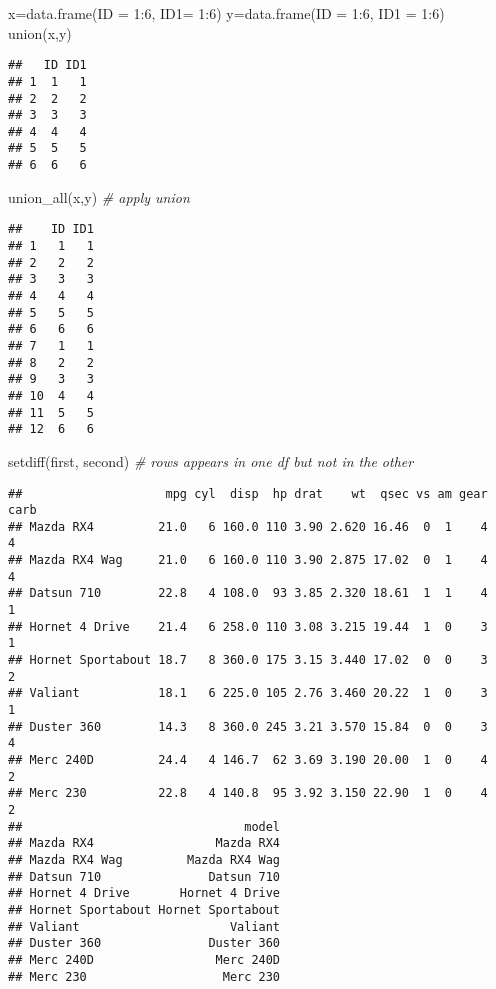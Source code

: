 \documentclass[
]{article}
\newenvironment{Shaded}{\begin{snugshade}}{\end{snugshade}}
\newcommand{\AttributeTok}[1]{\textcolor[rgb]{0.77,0.63,0.00}{#1}}
\newcommand{\CommentTok}[1]{\textcolor[rgb]{0.56,0.35,0.01}{\textit{#1}}}
\newcommand{\DecValTok}[1]{\textcolor[rgb]{0.00,0.00,0.81}{#1}}
\newcommand{\FunctionTok}[1]{\textcolor[rgb]{0.00,0.00,0.00}{#1}}
\newcommand{\NormalTok}[1]{#1}
\newcommand{\OtherTok}[1]{\textcolor[rgb]{0.56,0.35,0.01}{#1}}
\newcommand{\SpecialCharTok}[1]{\textcolor[rgb]{0.00,0.00,0.00}{#1}}
\begin{document}
\begin{Shaded}
\begin{Highlighting}[]
\NormalTok{x}\OtherTok{=}\FunctionTok{data.frame}\NormalTok{(}\AttributeTok{ID =} \DecValTok{1}\SpecialCharTok{:}\DecValTok{6}\NormalTok{, }\AttributeTok{ID1=} \DecValTok{1}\SpecialCharTok{:}\DecValTok{6}\NormalTok{)}
\NormalTok{y}\OtherTok{=}\FunctionTok{data.frame}\NormalTok{(}\AttributeTok{ID =} \DecValTok{1}\SpecialCharTok{:}\DecValTok{6}\NormalTok{,  }\AttributeTok{ID1 =} \DecValTok{1}\SpecialCharTok{:}\DecValTok{6}\NormalTok{)}
\FunctionTok{union}\NormalTok{(x,y)}
\end{Highlighting}
\end{Shaded}

\begin{verbatim}
##   ID ID1
## 1  1   1
## 2  2   2
## 3  3   3
## 4  4   4
## 5  5   5
## 6  6   6
\end{verbatim}

\begin{Shaded}
\begin{Highlighting}[]
\FunctionTok{union\_all}\NormalTok{(x,y) }\CommentTok{\# apply union}
\end{Highlighting}
\end{Shaded}

\begin{verbatim}
##    ID ID1
## 1   1   1
## 2   2   2
## 3   3   3
## 4   4   4
## 5   5   5
## 6   6   6
## 7   1   1
## 8   2   2
## 9   3   3
## 10  4   4
## 11  5   5
## 12  6   6
\end{verbatim}

\begin{Shaded}
\begin{Highlighting}[]
\FunctionTok{setdiff}\NormalTok{(first, second) }\CommentTok{\# rows appears in one df but not in the other}
\end{Highlighting}
\end{Shaded}

\begin{verbatim}
##                    mpg cyl  disp  hp drat    wt  qsec vs am gear carb
## Mazda RX4         21.0   6 160.0 110 3.90 2.620 16.46  0  1    4    4
## Mazda RX4 Wag     21.0   6 160.0 110 3.90 2.875 17.02  0  1    4    4
## Datsun 710        22.8   4 108.0  93 3.85 2.320 18.61  1  1    4    1
## Hornet 4 Drive    21.4   6 258.0 110 3.08 3.215 19.44  1  0    3    1
## Hornet Sportabout 18.7   8 360.0 175 3.15 3.440 17.02  0  0    3    2
## Valiant           18.1   6 225.0 105 2.76 3.460 20.22  1  0    3    1
## Duster 360        14.3   8 360.0 245 3.21 3.570 15.84  0  0    3    4
## Merc 240D         24.4   4 146.7  62 3.69 3.190 20.00  1  0    4    2
## Merc 230          22.8   4 140.8  95 3.92 3.150 22.90  1  0    4    2
##                               model
## Mazda RX4                 Mazda RX4
## Mazda RX4 Wag         Mazda RX4 Wag
## Datsun 710               Datsun 710
## Hornet 4 Drive       Hornet 4 Drive
## Hornet Sportabout Hornet Sportabout
## Valiant                     Valiant
## Duster 360               Duster 360
## Merc 240D                 Merc 240D
## Merc 230                   Merc 230
\end{verbatim}
\end{document}
